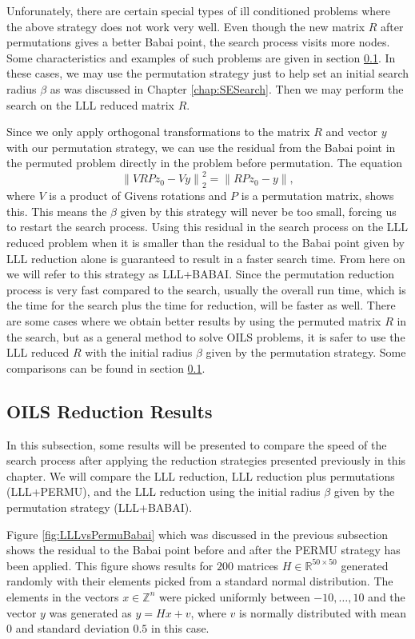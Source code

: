 \documentclass[12pt,Bold,letterpaper]{mcgilletdclass}
\newcommand{\vsp}{\vspace{\baselineskip}}
\begin{document}
Unforunately, there are certain special types of ill conditioned problems where the above strategy does not work very well. Even though the new matrix $R$ after permutations gives a better Babai point, the search process visits more nodes. Some characteristics and examples of such problems are given in section \ref{sec:ILSReductionResults}. In these cases, we may use the permutation strategy just to help set an initial search radius $\beta$ as was discussed in Chapter \ref{chap:SESearch}. Then we may perform the search on the LLL reduced matrix $R$.

Since we only apply orthogonal transformations to the matrix $R$ and vector $y$ with our permutation strategy, we can use the residual from the Babai point in the permuted problem directly in the problem before permutation. The equation $$\left \| VRPz_0 - Vy \right \|_2^2 = \left \| RPz_0 - y \right \|,$$ where $V$ is a product of Givens rotations and $P$ is a permutation matrix, shows this. This means the $\beta$ given by this strategy will never be too small, forcing us to restart the search process. Using this residual in the search process on the LLL reduced problem when it is smaller than the residual to the Babai point given by LLL reduction alone is guaranteed to result in a faster search time. From here on we will refer to this strategy as LLL+BABAI. Since the permutation reduction process is very fast compared to the search, usually the overall run time, which is the time for the search plus the time for reduction, will be faster as well. There are some cases where we obtain better results by using the permuted matrix $R$ in the search, but as a general method to solve OILS problems, it is safer to use the LLL reduced $R$ with the initial radius $\beta$ given by the permutation strategy. Some comparisons can be found in section \ref{sec:ILSReductionResults}.

\vsp \subsection{OILS Reduction Results} \label{sec:ILSReductionResults}
In this subsection, some results will be presented to compare the speed of the search process after applying the reduction strategies presented previously in this chapter. We will compare the LLL reduction, LLL reduction plus permutations (LLL+PERMU), and the LLL reduction using the initial radius $\beta$ given by the permutation strategy (LLL+BABAI).

Figure \ref{fig:LLLvsPermuBabai} which was discussed in the previous subsection
shows the residual to the Babai point before and after the PERMU strategy has
been applied. This figure shows results for $200$ matrices $H \in\mathbb{R}^{50
\times 50}$ generated randomly with their elements picked from a standard normal
distribution. The elements in the vectors $x \in \mathbb{Z}^n$ were picked
uniformly between $-10 , \dots, 10$ and the vector $y$ was generated as $y = Hx
+ v$, where $v$ is normally distributed with mean $0$ and standard deviation
$0.5$ in this case.
\end{document}
